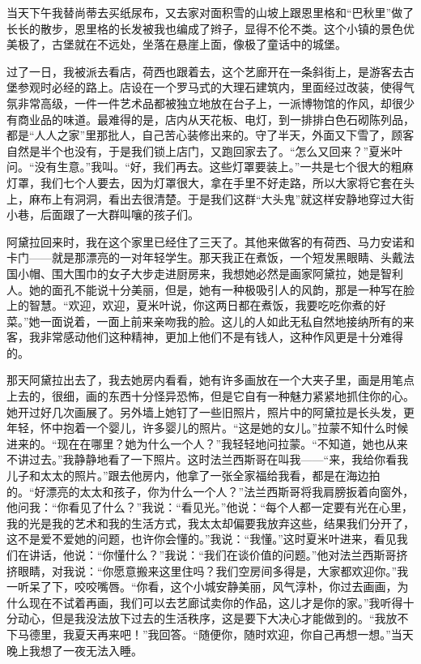 \par 当天下午我替尚蒂去买纸尿布，又去家对面积雪的山坡上跟恩里格和“巴秋里”做了长长的散步，恩里格的长发被我也编成了辫子，显得不伦不类。这个小镇的景色优美极了，古堡就在不远处，坐落在悬崖上面，像极了童话中的城堡。
\par 过了一日，我被派去看店，荷西也跟着去，这个艺廊开在一条斜街上，是游客去古堡参观时必经的路上。店设在一个罗马式的大理石建筑内，里面经过改装，使得气氛非常高级，一件一件艺术品都被独立地放在台子上，一派博物馆的作风，却很少有商业品的味道。最难得的是，店内从天花板、电灯，到一排排白色石砌陈列品，都是“人人之家”里那批人，自己苦心装修出来的。守了半天，外面又下雪了，顾客自然是半个也没有，于是我们锁上店门，又跑回家去了。“怎么又回来？”夏米叶问。“没有生意。”我叫。“好，我们再去。这些灯罩要装上。”一共是七个很大的粗麻灯罩，我们七个人要去，因为灯罩很大，拿在手里不好走路，所以大家将它套在头上，麻布上有洞洞，看出去很清楚。于是我们这群“大头鬼”就这样安静地穿过大街小巷，后面跟了一大群叫嚷的孩子们。
\par 阿黛拉回来时，我在这个家里已经住了三天了。其他来做客的有荷西、马力安诺和卡门——就是那漂亮的一对年轻学生。那天我正在煮饭，一个短发黑眼睛、头戴法国小帽、围大围巾的女子大步走进厨房来，我想她必然是画家阿黛拉，她是智利人。她的面孔不能说十分美丽，但是，她有一种极吸引人的风韵，那是一种写在脸上的智慧。“欢迎，欢迎，夏米叶说，你这两日都在煮饭，我要吃吃你煮的好菜。”她一面说着，一面上前来亲吻我的脸。这儿的人如此无私自然地接纳所有的来客，我非常感动他们这种精神，更加上他们不是有钱人，这种作风更是十分难得的。
\par 那天阿黛拉出去了，我去她房内看看，她有许多画放在一个大夹子里，画是用笔点上去的，很细，画的东西十分怪异恐怖，但是它自有一种魅力紧紧地抓住你的心。她开过好几次画展了。另外墙上她钉了一些旧照片，照片中的阿黛拉是长头发，更年轻，怀中抱着一个婴儿，许多婴儿的照片。“这是她的女儿。”拉蒙不知什么时候进来的。“现在在哪里？她为什么一个人？”我轻轻地问拉蒙。“不知道，她也从来不讲过去。”我静静地看了一下照片。这时法兰西斯哥在叫我——“来，我给你看我儿子和太太的照片。”跟去他房内，他拿了一张全家福给我看，都是在海边拍的。“好漂亮的太太和孩子，你为什么一个人？”法兰西斯哥将我肩膀扳着向窗外，他问我：“你看见了什么？”我说：“看见光。”他说：“每个人都一定要有光在心里，我的光是我的艺术和我的生活方式，我太太却偏要我放弃这些，结果我们分开了，这不是爱不爱她的问题，也许你会懂的。”我说：“我懂。”这时夏米叶进来，看见我们在讲话，他说：“你懂什么？”我说：“我们在谈价值的问题。”他对法兰西斯哥挤挤眼睛，对我说：“你愿意搬来这里住吗？我们空房间多得是，大家都欢迎你。”我一听呆了下，咬咬嘴唇。“你看，这个小城安静美丽，风气淳朴，你过去画画，为什么现在不试着再画，我们可以去艺廊试卖你的作品，这儿才是你的家。”我听得十分动心，但是我没法放下过去的生活秩序，这是要下大决心才能做到的。“我放不下马德里，我夏天再来吧！”我回答。“随便你，随时欢迎，你自己再想一想。”当天晚上我想了一夜无法入睡。
